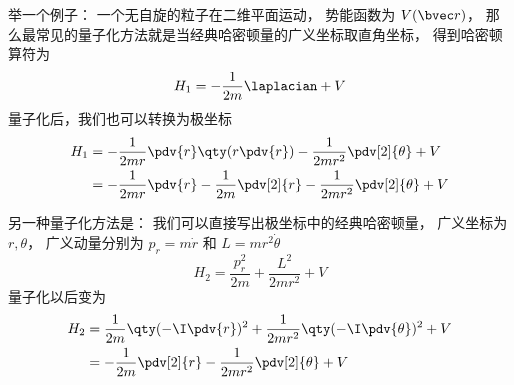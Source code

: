 
举一个例子： 一个无自旋的粒子在二维平面运动， 势能函数为 $V(\bvec r)$， 那么最常见的量子化方法就是当经典哈密顿量的广义坐标取直角坐标， 得到哈密顿算符为
\begin{equation}
H_1 = -\frac{1}{2m} \laplacian + V
\end{equation}
量子化后，我们也可以转换为极坐标
\begin{equation}
\begin{aligned}
H_1 &= -\frac{1}{2mr}\pdv{r}\qty(r \pdv{r}) - \frac{1}{2mr^2} \pdv[2]{\theta} + V\\
&= -\frac{1}{2mr}\pdv{r} -\frac{1}{2m}\pdv[2]{r} - \frac{1}{2mr^2} \pdv[2]{\theta} + V
\end{aligned}
\end{equation}

另一种量子化方法是： 我们可以直接写出极坐标中的经典哈密顿量， 广义坐标为 $r, \theta$， 广义动量分别为 $p_r = m\dot r$ 和 $L = mr^2\dot\theta$
\begin{equation}
H_2 = \frac{p_r^2}{2m} + \frac{L^2}{2mr^2} + V
\end{equation}
量子化以后变为
\begin{equation}
\begin{aligned}
H_2 &= \frac{1}{2m}\qty(-\I\pdv{r})^2 + \frac{1}{2mr^2}\qty(-\I\pdv{\theta})^2 + V\\
&= -\frac{1}{2m}\pdv[2]{r} - \frac{1}{2mr^2} \pdv[2]{\theta} + V
\end{aligned}
\end{equation}
